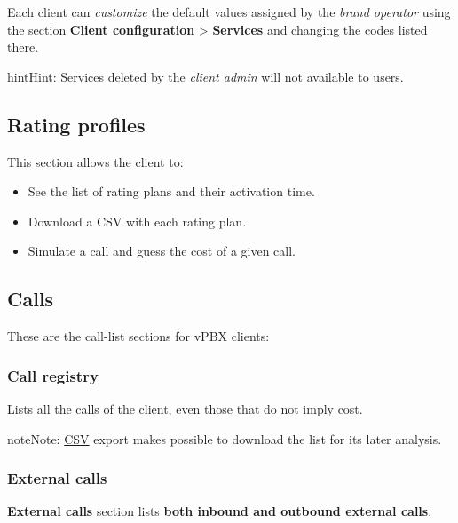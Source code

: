 \documentclass[letterpaper,10pt,english]{sphinxmanual}
\begin{document}
Each client can \emph{customize} the default values assigned by the \emph{brand operator}
using the section \textbf{Client configuration} \textgreater{} \textbf{Services} and changing the codes
listed there.

\begin{notice}{hint}{Hint:}
Services deleted by the \emph{client admin} will not available to users.
\end{notice}


\subsection{Rating profiles}
\label{administration_portal/client/vpbx/rating_profiles:rating-profiles}\label{administration_portal/client/vpbx/rating_profiles::doc}
This section allows the client to:
\begin{itemize}
\item {} 
See the list of rating plans and their activation time.

\item {} 
Download a CSV with each rating plan.

\item {} 
Simulate a call and guess the cost of a given call.

\end{itemize}


\subsection{Calls}
\label{administration_portal/client/vpbx/calls/index::doc}\label{administration_portal/client/vpbx/calls/index:calls}
These are the call-list sections for vPBX clients:


\subsubsection{Call registry}
\label{administration_portal/client/vpbx/calls/call_registry::doc}\label{administration_portal/client/vpbx/calls/call_registry:call-registry}\label{administration_portal/client/vpbx/calls/call_registry:id1}
Lists all the calls of the client, even those that do not imply cost.

\begin{notice}{note}{Note:}
\href{https://es.wikipedia.org/wiki/CSV}{CSV} export makes possible to
download the list for its later analysis.
\end{notice}


\subsubsection{External calls}
\label{administration_portal/client/vpbx/calls/external_calls:id1}\label{administration_portal/client/vpbx/calls/external_calls::doc}\label{administration_portal/client/vpbx/calls/external_calls:external-calls}
\textbf{External calls} section lists \textbf{both inbound and outbound external calls}.
\end{document}
